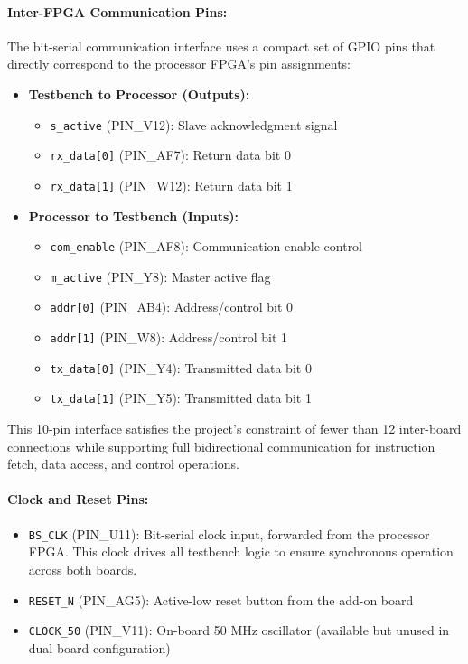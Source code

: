 \documentclass[12pt]{article}
\begin{document}
\paragraph{Inter-FPGA Communication Pins:}
The bit-serial communication interface uses a compact set of GPIO pins that directly correspond to the processor FPGA's pin assignments:

\begin{itemize}
    \item \textbf{Testbench to Processor (Outputs):}
    \begin{itemize}
        \item \texttt{s\_active} (PIN\_V12): Slave acknowledgment signal
        \item \texttt{rx\_data[0]} (PIN\_AF7): Return data bit 0
        \item \texttt{rx\_data[1]} (PIN\_W12): Return data bit 1
    \end{itemize}
    
    \item \textbf{Processor to Testbench (Inputs):}
    \begin{itemize}
        \item \texttt{com\_enable} (PIN\_AF8): Communication enable control
        \item \texttt{m\_active} (PIN\_Y8): Master active flag
        \item \texttt{addr[0]} (PIN\_AB4): Address/control bit 0
        \item \texttt{addr[1]} (PIN\_W8): Address/control bit 1
        \item \texttt{tx\_data[0]} (PIN\_Y4): Transmitted data bit 0
        \item \texttt{tx\_data[1]} (PIN\_Y5): Transmitted data bit 1
    \end{itemize}
\end{itemize}

This 10-pin interface satisfies the project's constraint of fewer than 12 inter-board connections while supporting full bidirectional communication for instruction fetch, data access, and control operations.

\paragraph{Clock and Reset Pins:}
\begin{itemize}
    \item \texttt{BS\_CLK} (PIN\_U11): Bit-serial clock input, forwarded from the processor FPGA. This clock drives all testbench logic to ensure synchronous operation across both boards.
    \item \texttt{RESET\_N} (PIN\_AG5): Active-low reset button from the add-on board
    \item \texttt{CLOCK\_50} (PIN\_V11): On-board 50 MHz oscillator (available but unused in dual-board configuration)
\end{itemize}
\end{document}
